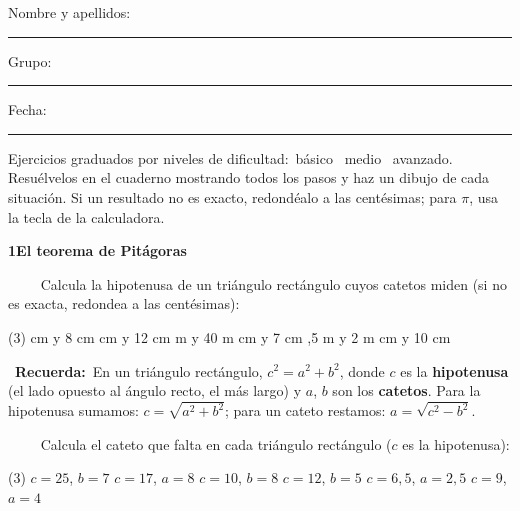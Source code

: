 \documentclass[11pt,a4paper]{article}
\newcommand{\estrelles}[1]{{\color{accent}\ifcase#1\or\faStar\faStar[regular]\faStar[regular]\or\faStar\faStar\faStar[regular]\or\faStar\faStar\faStar\fi}}
\newcounter{exer}
\newcommand{\ex}[1]{\par\needspace{4\baselineskip}\medskip\stepcounter{exer}\noindent{\color{navy}\bfseries\theexer.}\ \ {\small\estrelles{#1}}\ \ }
\newcommand{\seccio}[2]{\par\needspace{10\baselineskip}\bigskip
  \begin{tcolorbox}[colback=navy,colframe=navy,coltext=white,arc=2mm,boxrule=0pt,left=3mm,right=3mm,top=1.2mm,bottom=1.2mm]
  {\large\bfseries #1\quad #2}
  \end{tcolorbox}\vspace{-2pt}}
\newcommand{\recorda}[1]{\par\smallskip\begin{tcolorbox}[colback=accent!7,colframe=accent!55,arc=2mm,boxrule=0.5pt,left=2.5mm,right=2.5mm,top=1mm,bottom=1mm]\small{\color{accent}\faLightbulb[regular]}\ \textbf{Recuerda:}\ #1\end{tcolorbox}}
\begin{document}
\thispagestyle{primera}

\vspace{10pt}
Nombre y apellidos: \rule{6.6cm}{0.4pt}\hfill Grupo: \rule{1.6cm}{0.4pt}\hfill Fecha: \rule{2.2cm}{0.4pt}
\vspace{8pt}

\begin{tcolorbox}[colback=soft,colframe=soft,arc=2mm,left=3mm,right=3mm,top=1.5mm,bottom=1.5mm]
\small Ejercicios graduados por niveles de dificultad:\quad \estrelles{1}\ básico \qquad \estrelles{2}\ medio \qquad \estrelles{3}\ avanzado.\\[2pt] Resuélvelos en el cuaderno mostrando todos los pasos y haz un dibujo de cada situación. Si un resultado no es exacto, redondéalo a las centésimas; para $\pi$, usa la tecla de la calculadora.
\end{tcolorbox}

\seccio{1}{El teorema de Pitágoras}

\ex{1} Calcula la hipotenusa de un triángulo rectángulo cuyos catetos miden (si no es exacta, redondea a las centésimas):\begin{tasks}(3)
   cm y 8 cm
   cm y 12 cm
   m y 40 m
   cm y 7 cm
  ,5 m y 2 m
   cm y 10 cm
\end{tasks}\recorda{En un triángulo rectángulo, $c^2=a^2+b^2$, donde $c$ es la \textbf{hipotenusa} (el lado opuesto al ángulo recto, el más largo) y $a$, $b$ son los \textbf{catetos}. Para la hipotenusa sumamos: $c=\sqrt{a^2+b^2}$; para un cateto restamos: $a=\sqrt{c^2-b^2}$.}

\ex{1} Calcula el cateto que falta en cada triángulo rectángulo ($c$ es la hipotenusa):\begin{tasks}(3)
  \task $c=25$, $b=7$
  \task $c=17$, $a=8$
  \task $c=10$, $b=8$
  \task $c=12$, $b=5$
  \task $c=6{,}5$, $a=2{,}5$
  \task $c=9$, $a=4$
\end{tasks}
\end{document}
